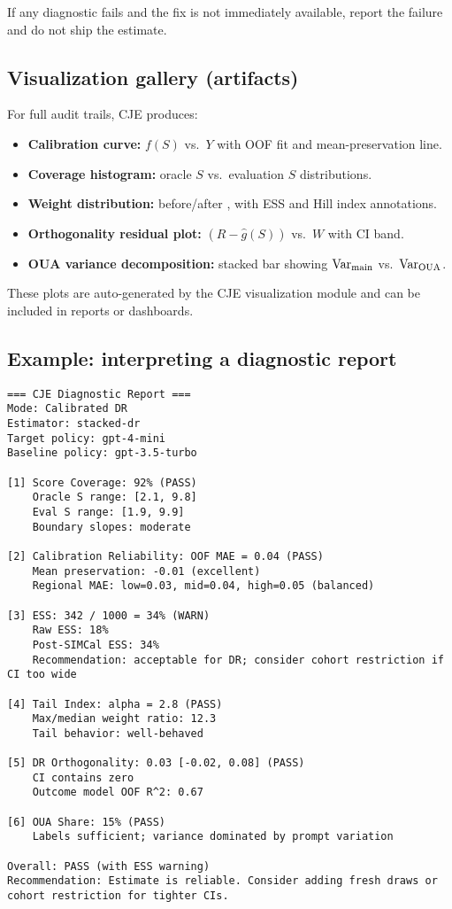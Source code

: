 If any diagnostic fails and the fix is not immediately available, report the failure and do not ship the estimate.

\subsection{Visualization gallery (artifacts)}

For full audit trails, CJE produces:
\begin{itemize}
\item \textbf{Calibration curve:} $f(S)$ vs.\ $Y$ with OOF fit and mean-preservation line.
\item \textbf{Coverage histogram:} oracle $S$ vs.\ evaluation $S$ distributions.
\item \textbf{Weight distribution:} before/after \simcal, with ESS and Hill index annotations.
\item \textbf{Orthogonality residual plot:} $(R - \hat{g}(S))$ vs.\ $W$ with CI band.
\item \textbf{OUA variance decomposition:} stacked bar showing $\operatorname{Var}_{\text{main}}$ vs.\ $\operatorname{Var}_{\text{OUA}}$.
\end{itemize}

These plots are auto-generated by the CJE visualization module and can be included in reports or dashboards.

\subsection{Example: interpreting a diagnostic report}

\begin{lstlisting}
=== CJE Diagnostic Report ===
Mode: Calibrated DR
Estimator: stacked-dr
Target policy: gpt-4-mini
Baseline policy: gpt-3.5-turbo

[1] Score Coverage: 92% (PASS)
    Oracle S range: [2.1, 9.8]
    Eval S range: [1.9, 9.9]
    Boundary slopes: moderate

[2] Calibration Reliability: OOF MAE = 0.04 (PASS)
    Mean preservation: -0.01 (excellent)
    Regional MAE: low=0.03, mid=0.04, high=0.05 (balanced)

[3] ESS: 342 / 1000 = 34% (WARN)
    Raw ESS: 18%
    Post-SIMCal ESS: 34%
    Recommendation: acceptable for DR; consider cohort restriction if CI too wide

[4] Tail Index: alpha = 2.8 (PASS)
    Max/median weight ratio: 12.3
    Tail behavior: well-behaved

[5] DR Orthogonality: 0.03 [-0.02, 0.08] (PASS)
    CI contains zero
    Outcome model OOF R^2: 0.67

[6] OUA Share: 15% (PASS)
    Labels sufficient; variance dominated by prompt variation

Overall: PASS (with ESS warning)
Recommendation: Estimate is reliable. Consider adding fresh draws or cohort restriction for tighter CIs.
\end{lstlisting}


